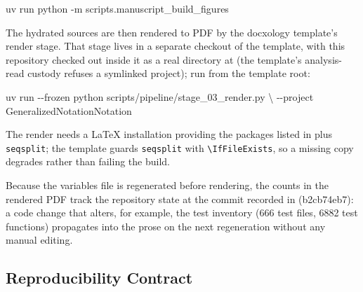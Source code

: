 \documentclass[
  english,
  9pt,
]{extarticle}
\newenvironment{Shaded}{}{}
\newcommand{\AttributeTok}[1]{\textcolor[rgb]{0.49,0.56,0.16}{#1}}
\newcommand{\DataTypeTok}[1]{\textcolor[rgb]{0.56,0.13,0.00}{#1}}
\newcommand{\ExtensionTok}[1]{#1}
\newcommand{\NormalTok}[1]{#1}
\begin{document}
\begin{Shaded}
\begin{Highlighting}[]
\ExtensionTok{uv}\NormalTok{ run python }\AttributeTok{{-}m}\NormalTok{ scripts.manuscript\_build\_figures}
\end{Highlighting}
\end{Shaded}

The hydrated sources are then rendered to PDF by the docxology
template's render stage. That stage lives in a separate checkout of the
template, with this repository checked out inside it as a real directory
at  (the template's
analysis-read custody refuses a symlinked project); run from the
template root:

\begin{Shaded}
\begin{Highlighting}[]
\ExtensionTok{uv}\NormalTok{ run }\AttributeTok{{-}{-}frozen}\NormalTok{ python scripts/pipeline/stage\_03\_render.py }\DataTypeTok{\textbackslash{}}
  \AttributeTok{{-}{-}project}\NormalTok{ GeneralizedNotationNotation}
\end{Highlighting}
\end{Shaded}

The render needs a LaTeX installation providing the packages listed in
 plus \texttt{seqsplit}; the template
guards \texttt{seqsplit} with \texttt{\textbackslash{}IfFileExists}, so
a missing copy degrades rather than failing the build.

Because the variables file is regenerated before rendering, the counts
in the rendered PDF track the repository state at the commit recorded in
 (b2cb74eb7): a code
change that alters, for example, the test inventory (666 test files,
6882 test functions) propagates into the prose on the next regeneration
without any manual editing.

\subsection{Reproducibility Contract}\label{reproducibility-contract}
\end{document}
